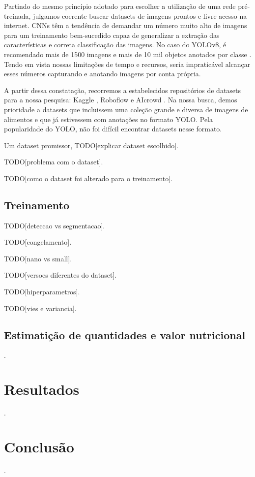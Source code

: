\documentclass[journal]{IEEEtran}
\begin{document}
Partindo do mesmo princípio adotado para escolher a utilização de uma rede pré-treinada, julgamos coerente buscar datasets de imagens prontos e livre acesso na internet. CNNs têm a tendência de demandar um número muito alto de imagens para um treinamento bem-sucedido capaz de generalizar a extração das características e correta classificação das imagens. No caso do YOLOv8, é recomendado mais de 1500 imagens e mais de 10 mil objetos anotados por classe \cite{ultralyticstipstraining}. Tendo em vista nossas limitações de tempo e recursos, seria impraticável alcançar esses números capturando e anotando imagens por conta própria.

A partir dessa constatação, recorremos a estabelecidos repositórios de datasets para a nossa pesquisa: Kaggle \cite{kaggle}, Roboflow  \cite{roboflow} e AIcrowd \cite{aicrowd}. Na nossa busca, demos prioridade a datasets que incluissem uma coleção grande e diversa de imagens de alimentos e que já estivessem com anotações no formato YOLO. Pela popularidade do YOLO, não foi difícil encontrar datasets nesse formato.

Um dataset promissor, TODO[explicar dataset escolhido].

TODO[problema com o dataset].

TODO[como o dataset foi alterado para o treinamento].

\subsection{Treinamento}
\label{sec:train}

TODO[deteccao vs segmentacao].

TODO[congelamento].

TODO[nano vs small].

TODO[versoes diferentes do dataset].

TODO[hiperparametros].

TODO[vies e variancia].

\subsection{Estimatição de quantidades e valor nutricional}
\label{sec:quant}
\lipsum[1].

\section{Resultados}
\label{sec:resultados}
\lipsum[1].

\section{Conclusão}
\label{sec:conclusao}
\lipsum[1].
\end{document}
